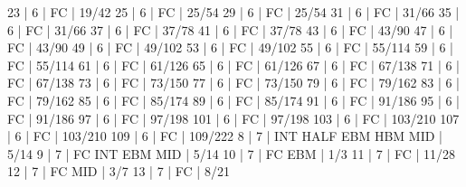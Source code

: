 23    |  6     |    FC                                        | 19/42   
25    |  6     |    FC                                        | 25/54   
29    |  6     |    FC                                        | 25/54   
31    |  6     |    FC                                        | 31/66   
35    |  6     |    FC                                        | 31/66   
37    |  6     |    FC                                        | 37/78   
41    |  6     |    FC                                        | 37/78   
43    |  6     |    FC                                        | 43/90   
47    |  6     |    FC                                        | 43/90   
49    |  6     |    FC                                        | 49/102   
53    |  6     |    FC                                        | 49/102   
55    |  6     |    FC                                        | 55/114   
59    |  6     |    FC                                        | 55/114   
61    |  6     |    FC                                        | 61/126   
65    |  6     |    FC                                        | 61/126   
67    |  6     |    FC                                        | 67/138   
71    |  6     |    FC                                        | 67/138   
73    |  6     |    FC                                        | 73/150   
77    |  6     |    FC                                        | 73/150   
79    |  6     |    FC                                        | 79/162   
83    |  6     |    FC                                        | 79/162   
85    |  6     |    FC                                        | 85/174   
89    |  6     |    FC                                        | 85/174   
91    |  6     |    FC                                        | 91/186   
95    |  6     |    FC                                        | 91/186   
97    |  6     |    FC                                        | 97/198   
101   |  6     |    FC                                        | 97/198   
103   |  6     |    FC                                        | 103/210   
107   |  6     |    FC                                        | 103/210   
109   |  6     |    FC                                        | 109/222   
8     |  7     |        INT  HALF  EBM  HBM  MID              | 5/14   
9     |  7     |    FC  INT        EBM       MID              | 5/14   
10    |  7     |    FC             EBM                        | 1/3   
11    |  7     |    FC                                        | 11/28   
12    |  7     |    FC                       MID              | 3/7   
13    |  7     |    FC                                        | 8/21   
